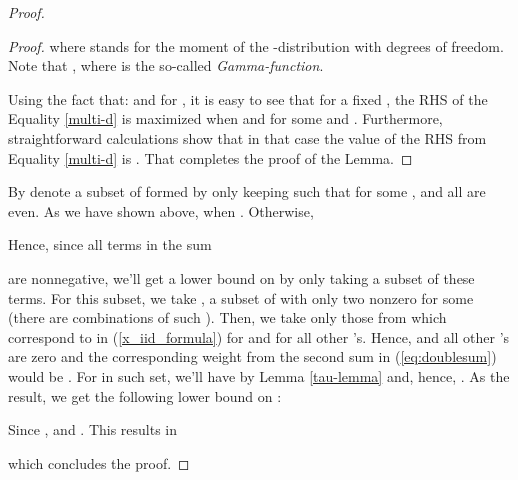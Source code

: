 \begin{proof}
\begin{proof}
where  stands for the  moment of the -distribution with  degrees of freedom.
Note that ,
where  is the so-called \textit{Gamma-function}.

Using the fact that:  and  for , it is easy to see 
that for a fixed , the RHS of the Equality \ref{multi-d} is maximized when  and  for some  and . Furthermore, straightforward calculations show that in that case the value of the RHS from Equality \ref{multi-d} is . That completes the proof of the Lemma.
\end{proof}


By  denote a subset of  formed by only keeping  such that for some ,  and all  are even. As we have shown above,  when . Otherwise,

Hence, since all terms in the sum

are nonnegative, we'll get a lower bound on  by only taking a subset of these terms. For this subset, we take , a subset of  with only two nonzero  for some  (there are  combinations of such ). Then, we take only those  from  which correspond to  in (\ref{x_iid_formula}) for  and  for all other 's. Hence,  and all other 's are zero and the corresponding weight from the second sum in (\ref{eq:doublesum}) would be . For  in such set, we'll have  by Lemma \ref{tau-lemma} and, hence, . As the result, we get the following lower bound on :

Since ,  and . This results in

which concludes the proof.


\end{proof}
